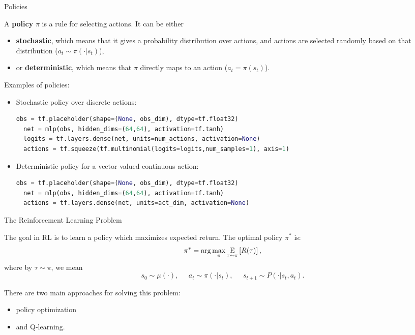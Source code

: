 \documentclass[9pt]{beamer}
\newcommand{\underE}[2]{\underset{\begin{subarray}{c}#1 \end{subarray}}{\E}\left[ #2 \right]}
\begin{document}
\begin{frame}[fragile]{Policies}

A \textbf{policy} $\pi$ is a rule for selecting actions. It can be either
\begin{itemize}
\item \textbf{stochastic}, which means that it gives a probability distribution over actions, and actions are selected randomly based on that distribution ($a_t \sim \pi(\cdot|s_t)$),
\item or \textbf{deterministic}, which means that $\pi$ directly maps to an action ($a_t = \pi(s_t)$). 
\end{itemize}

\pause


\lstset{style=mystyle}

Examples of policies:
%
\begin{itemize}
\item Stochastic policy over discrete actions:
\begin{lstlisting}[language=python]
  obs = tf.placeholder(shape=(None, obs_dim), dtype=tf.float32)
  net = mlp(obs, hidden_dims=(64,64), activation=tf.tanh)
  logits = tf.layers.dense(net, units=num_actions, activation=None)
  actions = tf.squeeze(tf.multinomial(logits=logits,num_samples=1), axis=1)
\end{lstlisting}
\item Deterministic policy for a vector-valued continuous action:
\begin{lstlisting}[language=python]
  obs = tf.placeholder(shape=(None, obs_dim), dtype=tf.float32)
  net = mlp(obs, hidden_dims=(64,64), activation=tf.tanh)
  actions = tf.layers.dense(net, units=act_dim, activation=None)
\end{lstlisting}

\end{itemize}

\lstset{style=mystyle3}

\end{frame}

\begin{frame}{The Reinforcement Learning Problem}

The goal in RL is to learn a policy which maximizes expected return. The optimal policy $\pi^*$ is:
%
\begin{equation*}
\pi^* = \arg \max_{\pi} \underE{\tau \sim \pi}{R(\tau)},
\end{equation*}
%
where by $\tau \sim \pi$, we mean
%
\begin{equation*}
s_0 \sim \mu(\cdot), \;\;\;\;\; a_t \sim \pi(\cdot|s_t), \;\;\;\;\; s_{t+1} \sim P(\cdot | s_t, a_t).
\end{equation*}


There are two main approaches for solving this problem:
\begin{itemize}
\item policy optimization
\item and Q-learning.
\end{itemize}

\end{frame}
\end{document}
